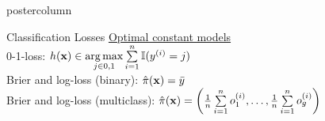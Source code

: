 \documentclass{beamer}
\begin{document}
\begin{frame}[fragile]{}
\begin{columns}
\begin{column}{.31\textwidth}
\begin{beamercolorbox}[center]{postercolumn}
\begin{minipage}{.98\textwidth}
{\begin{myblock}{Classification Losses}
\underline{Optimal constant models}\\[-1ex]
0-1-loss: $h(\mathbf{x}) \in \mathop{\mathrm{arg\,max}} \limits_{j \in {0,1}} \sum\limits_{i=1}^n \mathbb{I}(y^{(i)} = j) $\\
Brier and log-loss (binary): $\hat \pi(\mathbf{x}) = \bar{y}$\\
Brier and log-loss (multiclass): $\hat \pi(\mathbf{x}) = \left(\frac{1}{n} \sum\limits_{i=1}^n o_1^{(i)}, \dots, \frac{1}{n} \sum\limits_{i=1}^n o_g^{(i)}\right)$ 


\end{myblock}

%             


  





}
\end{minipage}
\end{beamercolorbox}
\end{column}
\end{columns}
\end{frame}
\end{document}
